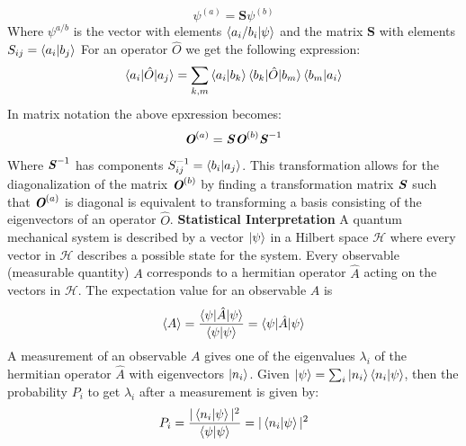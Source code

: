 \begin{equation}
    {\psi}^{(a)} = \textbf{S}\psi^{(b)}
\end{equation}
Where $\psi^{a/b}$ is the vector with elements $\braket{a_{i}/b_{i}|\psi}$ and the matrix $\textbf{S}$ with elements $S_{ij} = \braket{a_{i}|b_{j}}$ \newline
For an operator $\hat{O}$ we get the following expression: 
\begin{equation}
    \braket{a_{i}|\hat{O}|a_{j}} = \sum_{k,m} \braket{a_{i}|b_{k}} \braket{b_{k}|\hat{O}|{b_{m}}}\braket{b_{m}|a_{i}}
\end{equation}
In matrix notation the above epxression becomes:
\begin{equation}
    \textit{\textbf{O}}^{(a)} = \textbf{\textit{S}}\textit{\textbf{O}}^{(b)}\textbf{\textit{S}}^{-1}
\end{equation}
Where $\textbf{\textit{S}}^{-1}$ has components $S_{ij}^{-1} = \braket{b_{i}|a_{j}}$. This transformation allows for the diagonalization of the matrix $\textit{\textbf{O}}^{(b)}$ by finding a transformation matrix $\textbf{\textit{S}}$ such that $\textit{\textbf{O}}^{(a)}$ is diagonal is equivalent to transforming a basis consisting of the eigenvectors of an operator $\hat{O}$. \newline
\textbf{Statistical Interpretation} \newline
A quantum mechanical system is described by a vector $\ket{\psi}$ in a Hilbert space $\mathcal{H}$ where every vector in $\mathcal{H}$ describes a possible state for the system. \newline
Every observable (measurable quantity) $A$ corresponds to a hermitian operator $\hat{A}$ acting on the vectors in $\mathcal{H}$. \newline
The expectation value for an observable $A$ is 
\begin{equation}
    \braket{A} = \frac{\braket{\psi|\hat{A}|\psi}}{\braket{\psi|\psi}} = \braket{\psi|\hat{A}|\psi}
\end{equation}
A measurement of an observable $A$ gives one of the eigenvalues $\lambda_{i}$ of the hermitian operator $\hat{A}$ with eigenvectors $\ket{n_{i}}$. \newline 
Given $\ket{\psi}  = \sum_{i} \ket{n_{i}}\braket{n_{i}|\psi}$, then the probability $P_{i}$ to get $\lambda_{i}$ after a measurement is given by: 
\begin{equation}
    P_{i} = \frac{|\braket{n_{i}|\psi}|^2}{\braket{\psi|\psi}} = |\braket{n_{i}|\psi}|^2
\end{equation}
